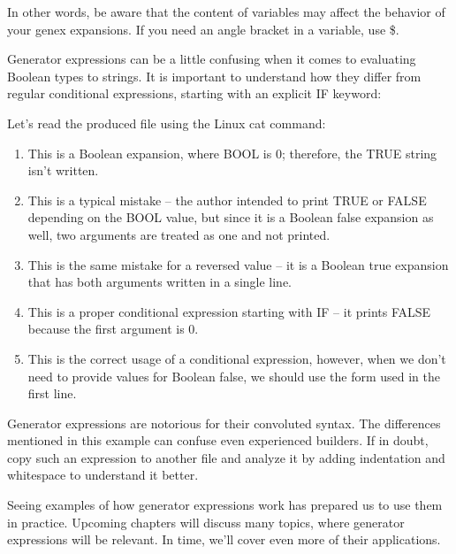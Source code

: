 In other words, be aware that the content of variables may affect the behavior of your genex expansions. If you need an angle bracket in a variable, use \$<ANGLE-R>.


Generator expressions can be a little confusing when it comes to evaluating Boolean types to strings. It is important to understand how they differ from regular conditional expressions, starting with an explicit IF keyword:



Let’s read the produced file using the Linux cat command:

\begin{enumerate}
\item
This is a Boolean expansion, where BOOL is 0; therefore, the TRUE string isn’t written.

\item
This is a typical mistake – the author intended to print TRUE or FALSE depending on the BOOL value, but since it is a Boolean false expansion as well, two arguments are treated as one and not printed.

\item
This is the same mistake for a reversed value – it is a Boolean true expansion that has both arguments written in a single line.

\item
This is a proper conditional expression starting with IF – it prints FALSE because the first argument is 0.

\item
This is the correct usage of a conditional expression, however, when we don’t need to provide values for Boolean false, we should use the form used in the first line.
\end{enumerate}

Generator expressions are notorious for their convoluted syntax. The differences mentioned in this example can confuse even experienced builders. If in doubt, copy such an expression to another file and analyze it by adding indentation and whitespace to understand it better.

Seeing examples of how generator expressions work has prepared us to use them in practice. Upcoming chapters will discuss many topics, where generator expressions will be relevant. In time, we’ll cover even more of their applications.






